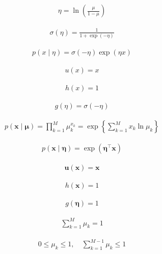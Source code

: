 \documentclass{article}
\begin{document}
\begin{align*}
\eta = \ln \left( \frac{\mu}{1-\mu} \right) 
\tag{3.142}
\end{align*}

\begin{align*}
\sigma(\eta) = \frac{1}{1 + \exp(-\eta)} 
\tag{3.143}
\end{align*}

\begin{align*}
p(x \mid \eta) = \sigma(-\eta) \exp(\eta x) 
\tag{3.144}
\end{align*}

\begin{align*}
u(x) = x 
\tag{3.145}
\end{align*}

\begin{align*}
h(x) = 1 
\tag{3.146}
\end{align*}

\begin{align*}
g(\eta) = \sigma(-\eta) 
\tag{3.147}
\end{align*}

\begin{align*}
p(\mathbf{x} \mid \boldsymbol{\mu}) = \prod_{k=1}^{M} \mu_k^{x_k} = \exp \left\{ \sum_{k=1}^{M} x_k \ln \mu_k \right\} 
\tag{3.148}
\end{align*}

\begin{align*}
p(\mathbf{x} \mid \boldsymbol{\eta}) = \exp \left( \boldsymbol{\eta}^{\top} \mathbf{x} \right) 
\tag{3.149}
\end{align*}

\begin{align*}
\mathbf{u}(\mathbf{x}) = \mathbf{x} 
\tag{3.150}
\end{align*}

\begin{align*}
h(\mathbf{x}) = 1 
\tag{3.151}
\end{align*}

\begin{align*}
g(\boldsymbol{\eta}) = 1 
\tag{3.152}
\end{align*}

\begin{align*}
\sum_{k=1}^{M} \mu_k = 1 
\tag{3.153}
\end{align*}

\begin{align*}
0 \leqslant \mu_k \leqslant 1, \quad \sum_{k=1}^{M-1} \mu_k \leqslant 1 
\tag{3.154}
\end{align*}
\end{document}
